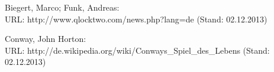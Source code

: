 \begin{thebibliography}{sotief}

Biegert, Marco; Funk, Andreas:
\newblock \\URL: http://www.qlocktwo.com/news.php?lang=de (Stand: 02.12.2013)

Conway, John Horton:
\newblock \\URL: http://de.wikipedia.org/wiki/Conways\_Spiel\_des\_Lebens (Stand: 02.12.2013)

\end{thebibliography}
